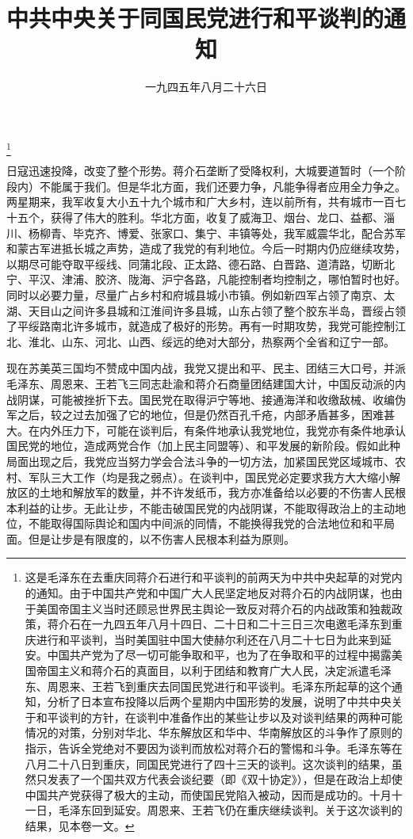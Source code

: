 
\title{中共中央关于同国民党进行和平谈判的通知}
\date{一九四五年八月二十六日}
\thanks{这是毛泽东在去重庆同蒋介石进行和平谈判的前两天为中共中央起草的对党内的通知。由于中国共产党和中国广大人民坚定地反对蒋介石的内战阴谋，也由于美国帝国主义当时还顾忌世界民主舆论一致反对蒋介石的内战政策和独裁政策，蒋介石在一九四五年八月十四日、二十日和二十三日三次电邀毛泽东到重庆进行和平谈判，当时美国驻中国大使赫尔利还在八月二十七日为此来到延安。中国共产党为了尽一切可能争取和平，也为了在争取和平的过程中揭露美国帝国主义和蒋介石的真面目，以利于团结和教育广大人民，决定派遣毛泽东、周恩来、王若飞到重庆去同国民党进行和平谈判。毛泽东所起草的这个通知，分析了日本宣布投降以后两个星期内中国形势的发展，说明了中共中央关于和平谈判的方针，在谈判中准备作出的某些让步以及对谈判结果的两种可能情况的对策，分别对华北、华东解放区和华中、华南解放区的斗争作了原则的指示，告诉全党绝对不要因为谈判而放松对蒋介石的警惕和斗争。毛泽东等在八月二十八日到重庆，同国民党进行了四十三天的谈判。这次谈判的结果，虽然只发表了一个国共双方代表会谈纪要（即《双十协定》），但是在政治上却使中国共产党获得了极大的主动，而使国民党陷入被动，因而是成功的。十月十一日，毛泽东回到延安。周恩来、王若飞仍在重庆继续谈判。关于这次谈判的结果，见本卷一文。}
\maketitle


日寇迅速投降，改变了整个形势。蒋介石垄断了受降权利，大城要道暂时（一个阶段内）不能属于我们。但是华北方面，我们还要力争，凡能争得者应用全力争之。两星期来，我军收复大小五十九个城市和广大乡村，连以前所有，共有城市一百七十五个，获得了伟大的胜利。华北方面，收复了威海卫、烟台、龙口、益都、淄川、杨柳青、毕克齐、博爱、张家口、集宁、丰镇等处，我军威震华北，配合苏军和蒙古军进抵长城之声势，造成了我党的有利地位。今后一时期内仍应继续攻势，以期尽可能夺取平绥线、同蒲北段、正太路、德石路、白晋路、道清路，切断北宁、平汉、津浦、胶济、陇海、沪宁各路，凡能控制者均控制之，哪怕暂时也好。同时以必要力量，尽量广占乡村和府城县城小市镇。例如新四军占领了南京、太湖、天目山之间许多县城和江淮间许多县城，山东占领了整个胶东半岛，晋绥占领了平绥路南北许多城市，就造成了极好的形势。再有一时期攻势，我党可能控制江北、淮北、山东、河北、山西、绥远的绝对大部分，热察两个全省和辽宁一部。

现在苏美英三国均不赞成中国内战，我党又提出和平、民主、团结三大口号，并派毛泽东、周恩来、王若飞三同志赴渝和蒋介石商量团结建国大计，中国反动派的内战阴谋，可能被挫折下去。国民党在取得沪宁等地、接通海洋和收缴敌械、收编伪军之后，较之过去加强了它的地位，但是仍然百孔千疮，内部矛盾甚多，困难甚大。在内外压力下，可能在谈判后，有条件地承认我党地位，我党亦有条件地承认国民党的地位，造成两党合作（加上民主同盟等）、和平发展的新阶段。假如此种局面出现之后，我党应当努力学会合法斗争的一切方法，加紧国民党区域城市、农村、军队三大工作（均是我之弱点）。在谈判中，国民党必定要求我方大大缩小解放区的土地和解放军的数量，并不许发纸币，我方亦准备给以必要的不伤害人民根本利益的让步。无此让步，不能击破国民党的内战阴谋，不能取得政治上的主动地位，不能取得国际舆论和国内中间派的同情，不能换得我党的合法地位和和平局面。但是让步是有限度的，以不伤害人民根本利益为原则。

